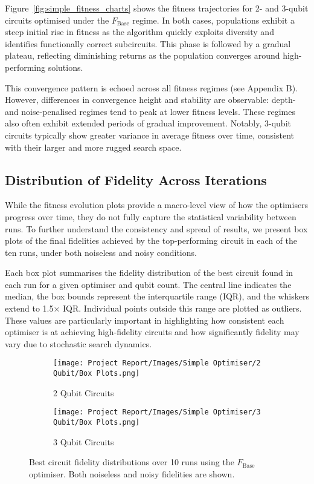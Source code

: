 \documentclass[11pt,a4paper]{article}
\begin{document}
Figure~\ref{fig:simple_fitness_charts} shows the fitness trajectories for 2- and 3-qubit circuits optimised under the $F_{\mathrm{Base}}$ regime. In both cases, populations exhibit a steep initial rise in fitness as the algorithm quickly exploits diversity and identifies functionally correct subcircuits. This phase is followed by a gradual plateau, reflecting diminishing returns as the population converges around high-performing solutions.\newline

This convergence pattern is echoed across all fitness regimes (see Appendix B). However, differences in convergence height and stability are observable: depth- and noise-penalised regimes tend to peak at lower fitness levels. These regimes also often exhibit extended periods of gradual improvement. Notably, 3-qubit circuits typically show greater variance in average fitness over time, consistent with their larger and more rugged search space.

\subsection{Distribution of Fidelity Across Iterations}\label{sec:box_plots}
While the fitness evolution plots provide a macro-level view of how the optimisers progress over time, they do not fully capture the statistical variability between runs. To further understand the consistency and spread of results, we present box plots of the final fidelities achieved by the top-performing circuit in each of the ten runs, under both noiseless and noisy conditions.\newline

Each box plot summarises the fidelity distribution of the best circuit found in each run for a given optimiser and qubit count. The central line indicates the median, the box bounds represent the interquartile range (IQR), and the whiskers extend to 1.5× IQR. Individual points outside this range are plotted as outliers. These values are particularly important in highlighting how consistent each optimiser is at achieving high-fidelity circuits and how significantly fidelity may vary due to stochastic search dynamics.

\begin{figure}[H]
\centering
\begin{subfigure}{.5\textwidth}
  \centering
  \texttt{[image: Project Report/Images/Simple Optimiser/2 Qubit/Box Plots.png]}
  \caption{2 Qubit Circuits}
  \label{fig:simple_box_2q}
\end{subfigure}%
\begin{subfigure}{.5\textwidth}
  \centering
  \texttt{[image: Project Report/Images/Simple Optimiser/3 Qubit/Box Plots.png]}
  \caption{3 Qubit Circuits}
  \label{fig:simple_box_3q}
\end{subfigure}
\caption{Best circuit fidelity distributions over 10 runs using the $F_{\mathrm{Base}}$ optimiser. Both noiseless and noisy fidelities are shown.}
\label{fig:simple_box_plots}
\end{figure}
\end{document}
